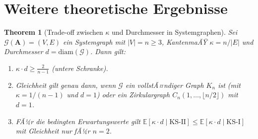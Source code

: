 ﻿\documentclass[12pt, a4paper, titlepage]{report}
\newtheorem{theorem}{Theorem}[section]
\theoremstyle{definition}
\theoremstyle{remark}
\newcommand{\vA}{\bm{A}}
\newcommand{\KS}{\mathrm{KS}}
\begin{document}
\section{Weitere theoretische Ergebnisse}

\begin{theorem}[Trade-off zwischen $\kappa$ und Durchmesser in Systemgraphen]
\label{thm:tradeoff}
Sei $\mathcal{G}(\vA) = (V, E)$ ein Systemgraph mit $|V| = n \geq 3$, KantenmaÃŸ
$\kappa = n/|E|$ und Durchmesser $d = \mathrm{diam}(\mathcal{G})$. Dann gilt:
\begin{enumerate}[label=(\roman*)]
  \item $\kappa \cdot d \geq \frac{2}{n-1}$ \quad (untere Schranke).
  \item Gleichheit gilt genau dann, wenn $\mathcal{G}$ ein vollstÃ¤ndiger Graph
    $K_n$ ist (mit $\kappa = 1/(n-1)$ und $d = 1$) oder ein Zirkulargraph
    $C_n(1, \ldots, \lfloor n/2 \rfloor)$ mit $d = 1$.
  \item FÃ¼r die bedingten Erwartungswerte gilt
    $\mathbb{E}[\kappa \cdot d \mid \KS\text{-II}] \leq
     \mathbb{E}[\kappa \cdot d \mid \KS\text{-I}]$
    mit Gleichheit nur fÃ¼r $n = 2$.
\end{enumerate}
\end{theorem}
\end{document}
